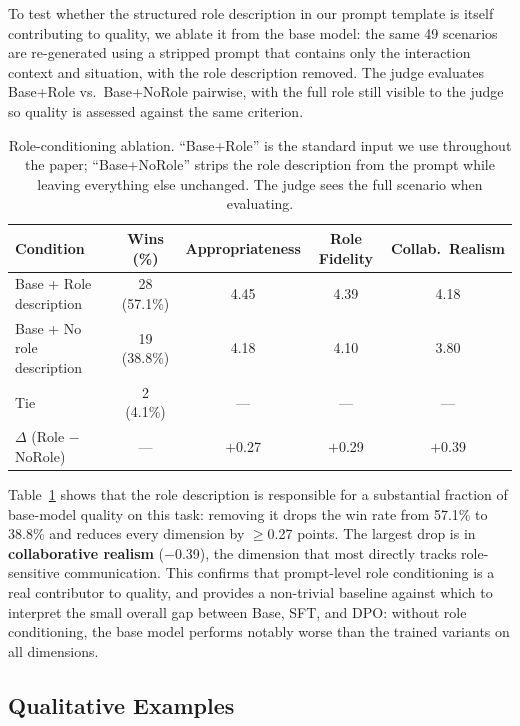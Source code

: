 \documentclass{article}
\begin{document}
To test whether the structured role description in our prompt template is itself contributing to quality, we ablate it from the base model: the same 49 scenarios are re-generated using a stripped prompt that contains only the interaction context and situation, with the role description removed. The judge evaluates Base+Role vs.\ Base+NoRole pairwise, with the full role still visible to the judge so quality is assessed against the same criterion.

\begin{table}[t]
\caption{Role-conditioning ablation. ``Base+Role'' is the standard input we use throughout the paper; ``Base+NoRole'' strips the role description from the prompt while leaving everything else unchanged. The judge sees the full scenario when evaluating.}
\label{tab:ablation}
\begin{center}
\begin{tabular}{lcccc}
\toprule
\textbf{Condition} & \textbf{Wins (\%)} & \textbf{Appropriateness} & \textbf{Role Fidelity} & \textbf{Collab.\ Realism} \\
\midrule
Base + Role description & 28 (57.1\%) & 4.45 & 4.39 & 4.18 \\
Base + No role description & 19 (38.8\%) & 4.18 & 4.10 & 3.80 \\
Tie & 2 (4.1\%) & --- & --- & --- \\
\midrule
$\Delta$ (Role $-$ NoRole) & --- & $+$0.27 & $+$0.29 & $+$0.39 \\
\bottomrule
\end{tabular}
\end{center}
\end{table}

Table~\ref{tab:ablation} shows that the role description is responsible for a substantial fraction of base-model quality on this task: removing it drops the win rate from 57.1\% to 38.8\% and reduces every dimension by $\geq$0.27 points. The largest drop is in \textbf{collaborative realism} ($-$0.39), the dimension that most directly tracks role-sensitive communication. This confirms that prompt-level role conditioning is a real contributor to quality, and provides a non-trivial baseline against which to interpret the small overall gap between Base, SFT, and DPO: without role conditioning, the base model performs notably worse than the trained variants on all dimensions.

\subsection{Qualitative Examples}
\end{document}
